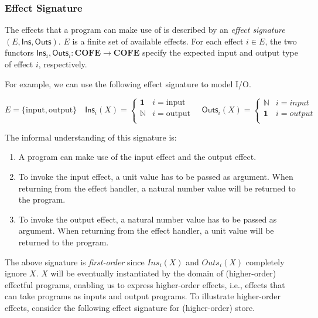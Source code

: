 \documentclass{article}
\theoremstyle{definition}
\theoremstyle{plain}
\theoremstyle{remark}
\newcommand{\Ins}{\mathsf{Ins}}
\newcommand{\Outs}{\mathsf{Outs}}
\newcommand{\efinput}{\mathrm{input}}
\newcommand{\efoutput}{\mathrm{output}}
\newcommand{\COFE}{\mathbf{COFE}}
\begin{document}
\subsubsection{Effect Signature}

The effects that a program can make use of is described by an \emph{effect signature} \((E, \Ins, \Outs)\).
\(E\) is a finite set of available effects.
For each effect \(i \in E\), the two functors \(\Ins_i, \Outs_i : \COFE \to \COFE\) specify the expected input and output type of effect \(i\), respectively.

For example, we can use the following effect signature to model I/O.

\[
  E = \{\efinput, \efoutput\}
  \quad
  \Ins_i(X) = \begin{cases}
    \mathbf{1} & i = \efinput\\
    \mathbb{N} & i = \efoutput\\
  \end{cases}
  \quad
  \Outs_i(X) = \begin{cases}
    \mathbb{N} & i = input\\
    \mathbf{1} & i = output\\
  \end{cases}
\]

The informal understanding of this signature is:

\begin{enumerate}
  \item A program can make use of the input effect and the output effect.
  \item To invoke the input effect, a unit value has to be passed as argument.
    When returning from the effect handler, a natural number value will be returned to the program.
  \item To invoke the output effect, a natural number value has to be passed as argument.
    When returning from the effect handler, a unit value will be returned to the program.
\end{enumerate}

The above signature is \emph{first-order} since \(Ins_i(X)\) and \(Outs_i(X)\) completely ignore \(X\).
\(X\) will be eventually instantiated by the domain of (higher-order) effectful programs, enabling us to express higher-order effects, i.e., effects that can take programs as inputs and output programs.
To illustrate higher-order effects, consider the following effect signature for (higher-order) store.
\end{document}
